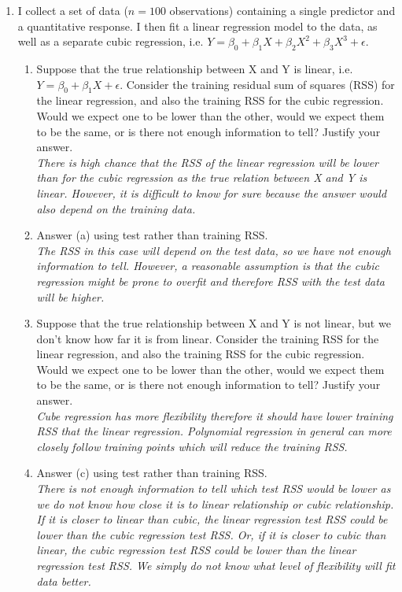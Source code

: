 \documentclass[12pt]{article}
\begin{document}
\begin{enumerate}
\item I collect a set of data ($n = 100$ observations) containing a single predictor and a quantitative response. I then fit a linear regression model to the data, as well as a separate cubic regression, i.e. $Y= \beta_0 + \beta_1X + \beta_2X^2 + \beta_3X^3 + \epsilon$.
\begin{enumerate}[label=(\alph*)]
    \item Suppose that the true relationship between X and Y is linear, i.e.$Y=\beta_0 + \beta_1X + \epsilon$. Consider the training residual sum of squares (RSS) for the linear regression, and also the training RSS for the cubic regression. Would we expect one to be lower than the other, would we expect them to be the same, or is there not enough information to tell? Justify your answer.
    \\ \textit{There is high chance that the RSS of the linear regression will be lower than for the cubic regression as the true relation between X and Y is linear. However, it is difficult to know for sure because the answer would also depend on the training data.}
    \item Answer (a) using test rather than training RSS.
    \\ \textit{The RSS in this case will depend on the test data, so we have not enough information to tell. However, a reasonable assumption is that the cubic regression might be prone to overfit and therefore RSS with the test data will be higher.}
    \item Suppose that the true relationship between X and Y is not linear, but we don’t know how far it is from linear. Consider the training RSS for the linear regression, and also the training RSS for the cubic regression. Would we expect one to be lower than the other, would we expect them to be the same, or is there not enough information to tell? Justify your answer.
    \\\textit{Cube regression has more flexibility therefore it should have lower training RSS that the linear regression. Polynomial regression in general can more closely follow training points which will reduce the training RSS.}
    \item Answer (c) using test rather than training RSS.
    \\ \textit{There is not enough information to tell which test RSS would be lower as we do not know how close it is to linear relationship or cubic relationship. If it is closer to linear than cubic, the linear regression test RSS could be lower than the cubic regression test RSS. Or, if it is closer to cubic than linear, the cubic regression test RSS could be lower than the linear regression test RSS. We simply do not know what level of flexibility will fit data better.}
\end{enumerate}

\end{enumerate}


 
 
\end{document}
